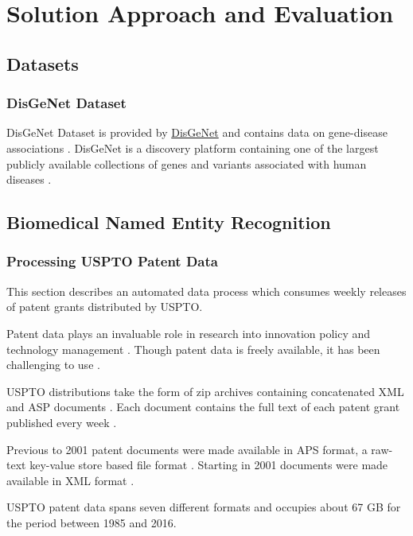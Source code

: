 \part{Solution Approach and Evaluation}

\chapter{Datasets}
\label{cha:datasets}

\section{DisGeNet Dataset}
\label{disgenetds}
DisGeNet Dataset is provided by \href{https://www.disgenet.org/}{DisGeNet} and contains data on gene-disease associations \cite{Piero2019TheDK}. 
DisGeNet is a discovery platform containing one of the largest publicly available collections of genes and variants associated with human diseases \cite{Piero2019TheDK}.

\chapter{Biomedical Named Entity Recognition}
\label{cha:biomedner}
\section{Processing USPTO Patent Data}
This section describes an automated data process which consumes weekly releases of patent grants distributed by USPTO.

Patent data plays an invaluable role in research into innovation policy and technology management \cite{fierro2014processing}.
Though patent data is freely available, it has been challenging to use \cite{fierro2014processing}.

USPTO distributions take the form of zip archives containing concatenated XML and ASP documents \cite{fierro2014processing}.
Each document contains the full text of each patent grant published every week \cite{fierro2014processing}.

Previous to 2001 patent documents were made available in APS format, a raw-text key-value store based file format \cite{fierro2014processing}.
Starting in 2001 documents were made available in XML format \cite{fierro2014processing}.

USPTO patent data spans seven different formats and occupies about 67 GB for the period between 1985 and 2016.

